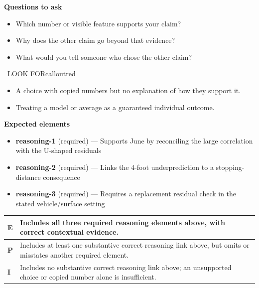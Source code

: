 \documentclass[11pt]{article}
\begin{document}
\textbf{Questions to ask}
\begin{itemize}[leftmargin=1.5em,itemsep=2pt,topsep=2pt]
  \item Which number or visible feature supports your claim?
  \item Why does the other claim go beyond that evidence?
  \item What would you tell someone who chose the other claim?
\end{itemize}

\begin{callout}{\IconWarn\ LOOK FOR}{calloutred}
\begin{itemize}[leftmargin=1.5em,itemsep=2pt,topsep=2pt]
  \item A choice with copied numbers but no explanation of how they support it.
  \item Treating a model or average as a guaranteed individual outcome.
\end{itemize}
\end{callout}


\textbf{Expected elements}
\begin{itemize}[leftmargin=1.5em,itemsep=2pt,topsep=2pt]
  \item \textbf{reasoning-1} (required) --- Supports June by reconciling the large correlation with the U-shaped residuals
  \item \textbf{reasoning-2} (required) --- Links the 4-foot underprediction to a stopping-distance consequence
  \item \textbf{reasoning-3} (required) --- Requires a replacement residual check in the stated vehicle/surface setting
\end{itemize}

{\small\renewcommand{\arraystretch}{1.25}
\noindent\begin{tabular}{|p{0.5in}|p{5.9in}|}
\hline
\textbf{E} & Includes all three required reasoning elements above, with correct contextual evidence. \\ \hline
\textbf{P} & Includes at least one substantive correct reasoning link above, but omits or misstates another required element. \\ \hline
\textbf{I} & Includes no substantive correct reasoning link above; an unsupported choice or copied number alone is insufficient. \\ \hline
\end{tabular}}
\end{document}
